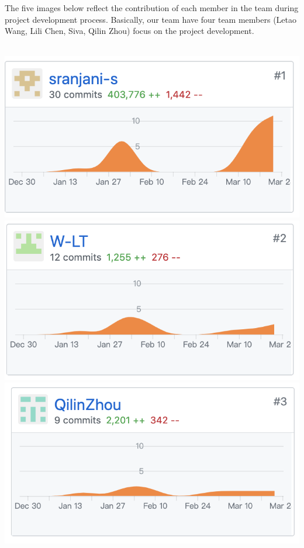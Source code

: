 \documentclass{article}
\begin{document}
The five images below reflect the contribution of each member in the team during project development process. Basically, our team have four team members (Letao Wang, Lili Chen, Siva, Qilin Zhou) focus on the project development.\\\\


\begin{minipage}
\centering
\includegraphics[scale=0.5]{siva.png}
\includegraphics[scale=0.5]{Letao.png}
\includegraphics[scale=0.5]{Qilin.png}

\end{minipage}
\end{document}
